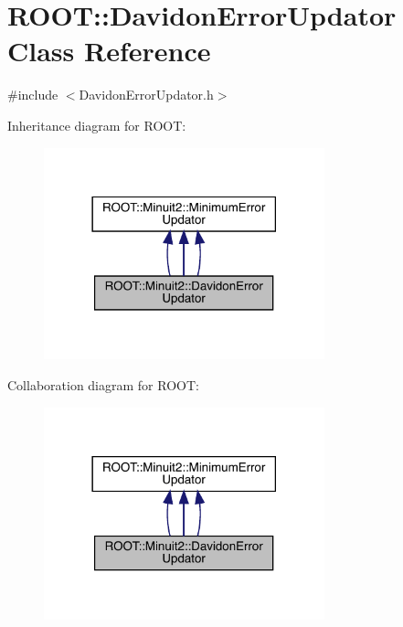 \hypertarget{classROOT_1_1Minuit2_1_1DavidonErrorUpdator}{}\section{R\+O\+OT\+:\+:Davidon\+Error\+Updator Class Reference}
\label{classROOT_1_1Minuit2_1_1DavidonErrorUpdator}


{\ttfamily \#include $<$Davidon\+Error\+Updator.\+h$>$}



Inheritance diagram for R\+O\+OT\+:
\nopagebreak
\begin{figure}[H]
\begin{center}
\leavevmode
\includegraphics[width=230pt]{d3/dd6/classROOT_1_1Minuit2_1_1DavidonErrorUpdator__inherit__graph}
\end{center}
\end{figure}


Collaboration diagram for R\+O\+OT\+:
\nopagebreak
\begin{figure}[H]
\begin{center}
\leavevmode
\includegraphics[width=230pt]{d0/dba/classROOT_1_1Minuit2_1_1DavidonErrorUpdator__coll__graph}
\end{center}
\end{figure}
